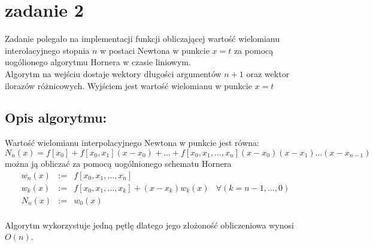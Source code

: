 \section{zadanie 2}
Zadanie polegało na implementacji funkcji obliczającej wartość wielomianu interolacyjnego stopnia \(n\) w postaci Newtona w punkcie \(x = t\) za pomocą uogólionego algorytmu Hornera w czasie liniowym.\\
Algorytm na wejściu dostaje wektory długości argumentów \(n + 1\) oraz wektor ilorazów różnicowych.
Wyjściem jest wartość wielomianu w punkcie \(x = t\) 

\subsection{Opis algorytmu: }
Wartość wielomianu interpolacyjnego Newtona w punkcie jest równa:
\[N_n(x) = f[x_0] + f[x_0, x_1](x - x_0) + \ldots + f[x_0, x_1, \ldots, x_n](x - x_0)(x - x_1)\ldots(x - x_{n-1})\]
można ją obliczać za pomocą uogólnionego schematu Hornera
\begin{align*}
 w_n(x) & := & f[x_0, x_1, \ldots, x_n]&\\
 w_k(x) & := & f[x_0, x_1, \ldots, x_k] + (x - x_k)w_k(x)& \forall(k = n-1, \ldots, 0)\\
 N_n(x) & := & w_0(x) &\\
\end{align*}

Algorytm wykorzystuje jedną pętlę dlatego jego złożoność obliczeniowa wynosi \(O(n)\).
